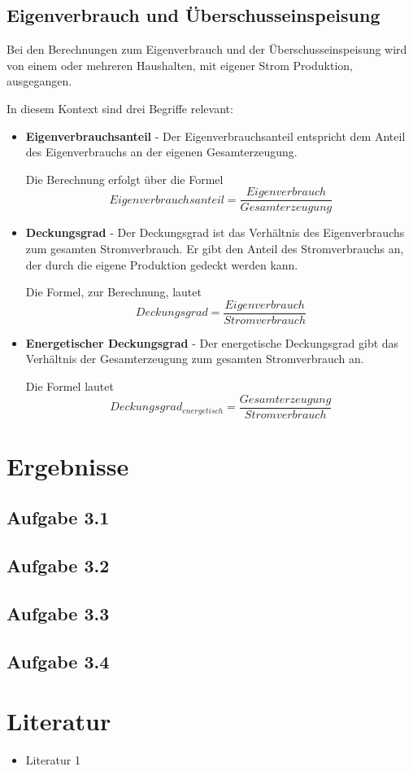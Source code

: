 \documentclass[a4paper,12pt]{article}
\begin{document}
	\subsection{Eigenverbrauch und Überschusseinspeisung}
	Bei den Berechnungen zum Eigenverbrauch und der Überschusseinspeisung wird von einem oder mehreren Haushalten, mit eigener Strom Produktion, ausgegangen.\\ \par
	In diesem Kontext sind drei Begriffe relevant:
	\begin{itemize}
		\item \textbf{Eigenverbrauchsanteil} - Der Eigenverbrauchsanteil entspricht dem Anteil des Eigenverbrauchs an der eigenen Gesamterzeugung.\\ \par
		\noindent Die Berechnung erfolgt über die Formel
		\begin{equation}
		Eigenverbrauchsanteil=\frac{Eigenverbrauch}{Gesamterzeugung}
		\end{equation}
		\item \textbf{Deckungsgrad} - Der Deckungsgrad ist das Verhältnis des Eigenverbrauchs zum gesamten Stromverbrauch.
		Er gibt den Anteil des Stromverbrauchs an, der durch die eigene Produktion gedeckt werden kann.\\ \par
		\noindent Die Formel, zur Berechnung, lautet
		\begin{equation}
		Deckungsgrad=\frac{Eigenverbrauch}{Stromverbrauch}
		\end{equation}
		\item \textbf{Energetischer Deckungsgrad} - Der energetische Deckungsgrad gibt das Verhältnis der Gesamterzeugung zum gesamten Stromverbrauch an.\\ \par
		\noindent Die Formel lautet
		\begin{equation}
		Deckungsgrad_{energetisch}=\frac{Gesamterzeugung}{Stromverbrauch}
		\end{equation}
	\end{itemize}
	\section{Ergebnisse}
	\subsection{Aufgabe 3.1}
	\subsection{Aufgabe 3.2}
	\subsection{Aufgabe 3.3}
	\subsection{Aufgabe 3.4}
	\newpage
	\section{Literatur}
	\begin{itemize}
		\item Literatur 1
	\end{itemize}
	\listoffigures
\end{document}
